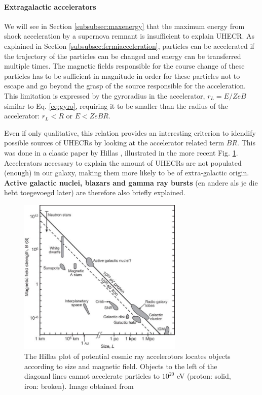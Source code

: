 \paragraph{Extragalactic accelerators}
We will see in Section \ref{subsubsec:maxenergy} that the maximum energy from shock acceleration by a supernova remnant is insufficient to explain UHECR. As explained in Section \ref{subsubsec:fermiacceleration}, particles can be accelerated if the trajectory of the particles can be changed and energy can be transferred multiple times. The magnetic fields responsible for the course change of these particles has to be sufficient in magnitude in order for these particles not to escape and go beyond the grasp of the source responsible for the acceleration. This limitation is expressed by the gyroradius in the accelerator, $r_L = E/ZeB$ similar to Eq. \ref{eq:gyro}, requiring it to be smaller than the radius of the accelerator: $r_L < R$ or $E < ZeBR$.

Even if only qualitative, this relation provides an interesting criterion to idendify possible sources of UHECRs by looking at the accelerator related term $BR$. This was done in a classic paper by Hillas \cite{Hillas:1985is}, illustrated in the more recent Fig. \ref{fig:hillas}. Accelerators necessary to explain the amount of UHECRs are not populated (enough) in our galaxy, making them more likely to be of extra-galactic origin. \textbf{Active galactic nuclei, blazars and gamma ray bursts} (en andere als je die hebt toegevoegd later) are therefore also briefly explained.

\begin{figure}
\label{fig:hillas}
\centering
\includegraphics[width = 0.7\textwidth]{chapter3/img/Hillas.jpg}
\caption{The Hillas plot of potential cosmic ray accelerotors locates objects according to size and magnetic field. Objects to the left of the diagonal lines cannot accelerate particles to $10^{20}$ eV (proton: solid, iron: broken). Image obtained from \cite{Bauleo:2009zz}}
\end{figure}




